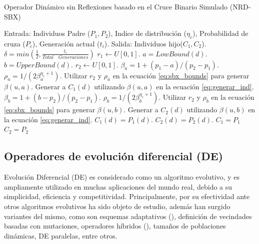  \begin{algorithm}[t]
\scriptsize
\caption{Operador Dinámico sin Reflexiones basado en el Cruce Binario Simulado (NRD-SBX)}
\label{alg:NRDSBX_Operator}
\begin{algorithmic}[1]
    \STATE Entrada: Individuos Padre ($P_1, P_2$), Indice de distribución ($\eta_c$), Probabilidad de cruza ($P_c$), Generación actual ($t_i$).
    \STATE Salida: Individuos hijo($C_1, C_2$).
    \STATE $\delta = min( \frac{1}{2} ,\frac{t_i}{Total\quad Generaciones})$
    \STATE $r_1 \leftarrow U[0, 1]$.
		 \STATE $a = LowBound(d)$.	
		 \STATE $b = UpperBound(d)$.    
		 \STATE $ r_2 \leftarrow U[0, 1]$.
		 \STATE $\beta_a = 1 +(p_1 - a)/(p_2 - p_1)$.
		 \STATE $\rho_a = 1/(2 \beta_a^{\eta_c+1})$.
		 \STATE Utilizar $r_2$ y $\rho_a$ en la ecuación \ref{eq:sbx_bounds} para generar $\beta(u,a)$.  
		 \STATE Generar a $C_1(d)$ utilizando $\beta(u, a)$ en la ecuación \ref{eq:generar_ind}. 
		 \STATE $\beta_b = 1 +(b - p_2)/(p_2 - p_1)$.
		 \STATE $\rho_b = 1/(2 \beta_b^{\eta_c+1})$.
		 \STATE Utilizar $r_2$ y $\rho_b$ en la ecuación \ref{eq:sbx_bounds} para generar $\beta(u,b)$. 
		 \STATE Generar a $C_2(d)$ utilizando $\beta(u, b)$ en la ecuación \ref{eq:generar_ind}.
        \ELSE {}
	   \STATE $C_1(d) = P_1(d)$. 
	   \STATE $C_2(d) = P_2(d)$.
        \ENDIF {}
       \ENDFOR
    \ELSE
	\STATE $C_1 = P_1$
	\STATE $C_2 = P_2$
    \ENDIF
\end{algorithmic}
\end{algorithm}


%

\subsection{Operadores de evolución diferencial (DE)}

Evolución Diferencial (DE) es considerado como un algoritmo evolutivo, y es ampliamente utilizado en muchas aplicaciones del mundo real, debido a su simplicidad, eficiencia y competitividad.
%
Principalmente, por su efectividad ante otros algoritmos evolutivos ha sido objeto de estudio, además han surgido variantes del mismo, como son esquemas adaptativos (\cite{zhang2009jade}), definición de vecindades basadas con mutaciones, operadores híbridos (\cite{Joel:OperatorAHX}), tamaños de poblaciones dinámicas, DE paralelas, entre otros.

